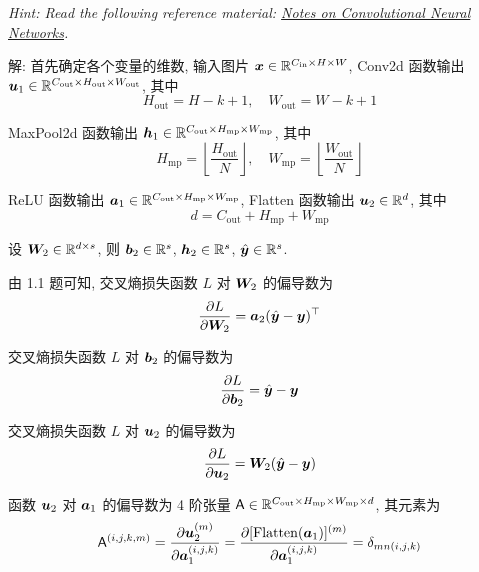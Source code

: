 \documentclass{article}
\begin{document}
\emph{Hint: Read the following reference material: \href{http://cogprints.org/5869/1/cnn_tutorial.pdf}{Notes on Convolutional Neural Networks}.}

解: 首先确定各个变量的维数, 输入图片 $\bm{x}\in\mathbb{R}^{C_{\text{in}}\times H\times W}$, Conv2d 函数输出 $\bm{u}_1\in\mathbb{R}^{C_{\text{out}}\times H_{\text{out}}\times W_{\text{out}}}$, 其中
\begin{equation}
  H_{\text{out}}=H-k+1,\quad W_{\text{out}}=W-k+1
\end{equation}

MaxPool2d 函数输出 $\bm{h}_1\in\mathbb{R}^{C_{\text{out}}\times H_{\text{mp}}\times W_{\text{mp}}}$, 其中
\begin{equation}
  H_{\text{mp}}=\left\lfloor\frac{H_{\text{out}}}{N}\right\rfloor,\quad W_{\text{mp}}=\left\lfloor\frac{W_{\text{out}}}{N}\right\rfloor
\end{equation}

ReLU 函数输出 $\bm{a}_1\in\mathbb{R}^{C_{\text{out}}\times H_{\text{mp}}\times W_{\text{mp}}}$, Flatten 函数输出 $\bm{u}_2\in\mathbb{R}^{d}$, 其中
\begin{equation}
  d=C_{\text{out}}+H_{\text{mp}}+W_{\text{mp}}
\end{equation}

设 $\bm{W}_2\in\mathbb{R}^{d\times s}$, 则 $\bm{b}_2\in\mathbb{R}^{s}$, $\bm{h}_2\in\mathbb{R}^{s}$, $\hat{\bm{y}}\in\mathbb{R}^{s}$.

由 1.1 题可知, 交叉熵损失函数 $L$ 对 $\bm{W}_2$ 的偏导数为
\begin{equation}
  \frac{\partial L}{\partial \bm{W}_2}=\bm{a}_2(\hat{\bm{y}}-\bm{y})^\top
\end{equation}

交叉熵损失函数 $L$ 对 $\bm{b}_2$ 的偏导数为
\begin{equation}
  \frac{\partial L}{\partial \bm{b}_2}=\hat{\bm{y}}-\bm{y}
\end{equation}

交叉熵损失函数 $L$ 对 $\bm{u}_2$ 的偏导数为
\begin{equation}
  \frac{\partial L}{\partial \bm{u}_2}=\bm{W}_2(\hat{\bm{y}}-\bm{y})
\end{equation}

函数 $\bm{u}_2$ 对 $\bm{a}_1$ 的偏导数为 4 阶张量 $\mathsf{A}\in\mathbb{R}^{C_{\text{out}}\times H_{\text{mp}}\times W_{\text{mp}}\times d}$, 其元素为
\begin{equation}
  \mathsf{A}^{(i,j,k,m)}
  =\frac{\partial\bm{u}_2^{(m)}}{\partial\bm{a}_1^{(i,j,k)}}
  =\frac{\partial[\mathrm{Flatten}(\bm{a}_1)]^{(m)}}{\partial\bm{a}_1^{(i,j,k)}}
  =\delta_{mn(i,j,k)}
\end{equation}
\end{document}
